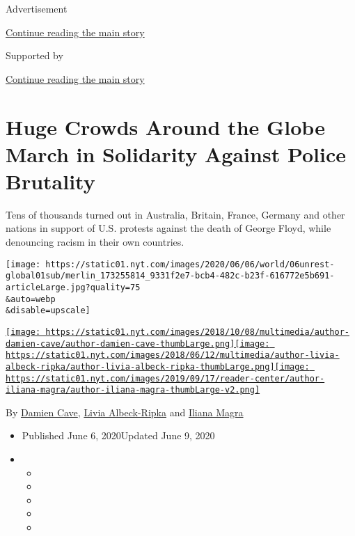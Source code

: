 Advertisement

\protect\hyperlink{after-top}{Continue reading the main story}

Supported by

\protect\hyperlink{after-sponsor}{Continue reading the main story}

\hypertarget{huge-crowds-around-the-globe-march-in-solidarity-against-police-brutality}{%
\section{Huge Crowds Around the Globe March in Solidarity Against Police
Brutality}\label{huge-crowds-around-the-globe-march-in-solidarity-against-police-brutality}}

Tens of thousands turned out in Australia, Britain, France, Germany and
other nations in support of U.S. protests against the death of George
Floyd, while denouncing racism in their own countries.

\texttt{[image: https://static01.nyt.com/images/2020/06/06/world/06unrest-global01sub/merlin\_173255814\_9331f2e7-bcb4-482c-b23f-616772e5b691-articleLarge.jpg?quality=75\\\&auto=webp\\\&disable=upscale]}

\href{https://www.nytimes.com/by/damien-cave}{\texttt{[image: https://static01.nyt.com/images/2018/10/08/multimedia/author-damien-cave/author-damien-cave-thumbLarge.png]}}\href{https://www.nytimes.com/by/livia-albeck-ripka}{\texttt{[image: https://static01.nyt.com/images/2018/06/12/multimedia/author-livia-albeck-ripka/author-livia-albeck-ripka-thumbLarge.png]}}\href{https://www.nytimes.com/by/iliana-magra}{\texttt{[image: https://static01.nyt.com/images/2019/09/17/reader-center/author-iliana-magra/author-iliana-magra-thumbLarge-v2.png]}}

By \href{https://www.nytimes.com/by/damien-cave}{Damien Cave},
\href{https://www.nytimes.com/by/livia-albeck-ripka}{Livia Albeck-Ripka}
and \href{https://www.nytimes.com/by/iliana-magra}{Iliana Magra}

\begin{itemize}
\item
  Published June 6, 2020Updated June 9, 2020
\item
  \begin{itemize}
  \item
  \item
  \item
  \item
  \item
  \end{itemize}
\end{itemize}

